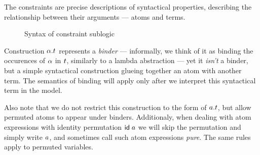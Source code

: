 \documentclass[english, mgr]{iithesis}
\renewcommand{\it}[1]{\textit{#1}}
\begin{document}
The constraints are precise descriptions of syntactical properties,
describing the relationship between their arguments --- atoms and terms.
\begin{figure}[htbp]
  \centering
  \caption{Syntax of constraint sublogic}
  \label{fig:terms-constraints-syntax}
\end{figure}

Construction $\alpha. t$ represents a \it{binder} ---
informally, we think of it as binding the occurences of $\alpha$ in $t$,
similarly to a lambda abstraction --- yet it \it{isn't} a binder,
but a simple syntactical construction glueing together an atom with another term.
The semantics of binding will apply only after we interpret this syntactical term in the model.

Also note that we do not restrict this construction to the form of $a. t$,
but allow permuted atoms to appear under binders.
Additionaly, when dealing with atom expressions with identity permutation $\mathsf{id} \;a$
we will skip the permutation and simply write $a$,
and sometimes call such atom expressions \it{pure}.
The same rules apply to permuted variables.
\end{document}
